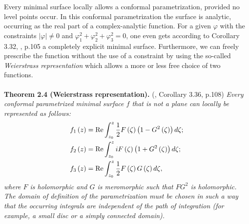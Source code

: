 \documentclass[a4paper]{article}
\numberwithin{equation}{section}
\begin{document}
Every minimal surface locally allows a conformal parametrization, provided no level points occur. In this conformal parametrization the surface is analytic, occurring as the real part of a complex-analytic function. For a given $\varphi$ with the constraints $\left| \varphi  \right| \ne 0$ and $\varphi _1^2 + \varphi _2^2 + \varphi _3^2 = 0$, one even gets according to Corollary 3.32, \cite{1}, p.105 a completely explicit minimal surface. Furthermore, we can freely prescribe the function without the use of a constraint by using the so-called \textit{Weierstrass representation} which allows a more or less free choice of two functions.\\
\\
\textbf{Theorem 2.4 (Weierstrass representation).} (\cite{1}, Corollary 3.36, p.108) \textit{Every conformal parametrized minimal surface $f$ that is not a plane can locally be represented as follows:}
\begin{align}
{f_1}\left( z \right) &= {\mathop{\rm Re}\nolimits} \int_{{z_0}}^z {\frac{1}{2}F\left( \zeta  \right)\left( {1 - {G^2}\left( \zeta  \right)} \right)d\zeta } ;\\
{f_2}\left( z \right) &= {\mathop{\rm Re}\nolimits} \int_{{z_0}}^z {iF\left( \zeta  \right)\left( {1 + {G^2}\left( \zeta  \right)} \right)d\zeta } ;\\
{f_3}\left( z \right) &= {\mathop{\rm Re}\nolimits} \int_{{z_0}}^z {\frac{1}{2}F\left( \zeta  \right)G\left( \zeta  \right)d\zeta } ,
\end{align}
\textit{where $F$ is holomorphic and $G$ is meromorphic such that $FG^2$ is holomorphic. The domain of definition of the parametrization must be chosen in such a way that the occurring integrals are independent of the path of integration (for example, a small disc or a simply connected domain).}
\end{document}
